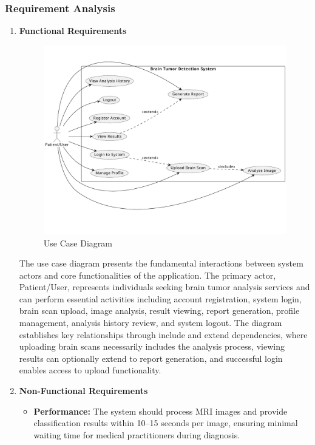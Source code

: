 \subsubsection{Requirement Analysis}
\begin{enumerate}[label=\roman*.]
    \item \textbf{Functional Requirements}
          \begin{center}
              \begin{figure}[H]
                  \centering
                  \includegraphics[width=0.85\linewidth]{Images/usecase.pdf}
                  \caption{Use Case Diagram}
                  \label{fig:UseCaseDiagram}
              \end{figure}
          \end{center}
          The use case diagram presents the fundamental interactions between system actors and core functionalities of the application. The primary actor, Patient/User, represents individuals seeking brain tumor analysis services and can perform essential activities including account registration, system login, brain scan upload, image analysis, result viewing, report generation, profile management, analysis history review, and system logout. The diagram establishes key relationships through include and extend dependencies, where uploading brain scans necessarily includes the analysis process, viewing results can optionally extend to report generation, and successful login enables access to upload functionality.

    \item \textbf{Non-Functional Requirements}
          \begin{itemize}
              \item \textbf{Performance:} The system should process MRI images and provide classification results within 10--15 seconds per image, ensuring minimal waiting time for medical practitioners during diagnosis.


\end{itemize}
\end{enumerate}

